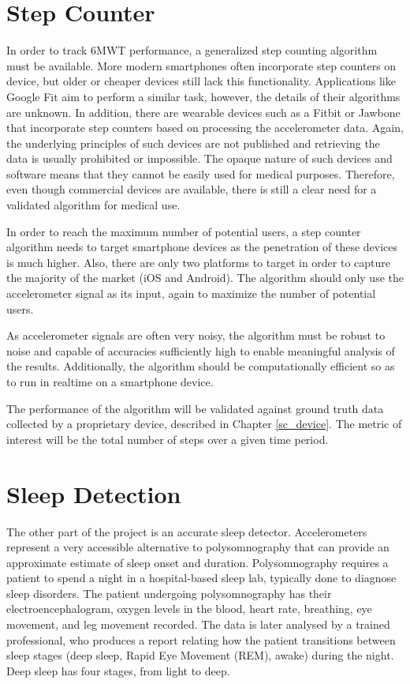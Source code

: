         \section{Step Counter}

            In order to track 6MWT performance, a generalized step counting algorithm must be available. More modern smartphones often incorporate step counters on device, but older or cheaper devices still lack this functionality. Applications like Google Fit aim to perform a similar task, however, the details of their algorithms are unknown. In addition, there are wearable devices such as a Fitbit or Jawbone that incorporate step counters based on processing the accelerometer data. Again, the underlying principles of such devices are not published and retrieving the data is usually prohibited or impossible. The opaque nature of such devices and software means that they cannot be easily used for medical purposes. Therefore, even though commercial devices are available, there is still a clear need for a validated algorithm for medical use.

            In order to reach the maximum number of potential users, a step counter algorithm needs to target smartphone devices as the penetration of these devices is much higher. Also, there are only two platforms to target in order to capture the majority of the market (iOS and Android). The algorithm should only use the accelerometer signal as its input, again to maximize the number of potential users.

            As accelerometer signals are often very noisy, the algorithm must be robust to noise and capable of accuracies sufficiently high to enable meaningful analysis of the results. Additionally, the algorithm should be computationally efficient so as to run in realtime on a smartphone device.

            The performance of the algorithm will be validated against ground truth data collected by a proprietary device, described in Chapter \ref{sc_device}. The metric of interest will be the total number of steps over a given time period.

        \section{Sleep Detection}

            The other part of the project is an accurate sleep detector. Accelerometers represent a very accessible alternative to polysomnography that can provide an approximate estimate of sleep onset and duration. Polysomnography requires a patient to spend a night in a hospital-based sleep lab, typically done to diagnose sleep disorders. The patient undergoing polysomnography has their electroencephalogram, oxygen levels in the blood, heart rate, breathing, eye movement, and leg movement recorded. The data is later analysed by a trained professional, who produces a report relating how the patient transitions between sleep stages (deep sleep, Rapid Eye Movement (REM), awake) during the night. Deep sleep has four stages, from light to deep.

